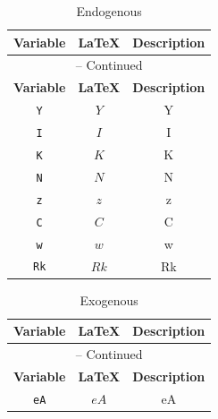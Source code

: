 \begin{center}
\begin{longtable}{ccc}
\caption{Endogenous}\\%
\hline%
\multicolumn{1}{c}{\textbf{Variable}} &
\multicolumn{1}{c}{\textbf{\LaTeX}} &
\multicolumn{1}{c}{\textbf{Description}}\\%
\hline\hline%
\endfirsthead
\multicolumn{3}{c}{{\tablename} \thetable{} -- Continued}\\%
\hline%
\multicolumn{1}{c}{\textbf{Variable}} &
\multicolumn{1}{c}{\textbf{\LaTeX}} &
\multicolumn{1}{c}{\textbf{Description}}\\%
\hline\hline%
\endhead
\texttt{Y} & $Y$ & Y\\
\texttt{I} & $I$ & I\\
\texttt{K} & $K$ & K\\
\texttt{N} & $N$ & N\\
\texttt{z} & $z$ & z\\
\texttt{C} & $C$ & C\\
\texttt{w} & $w$ & w\\
\texttt{Rk} & $Rk$ & Rk\\
\hline%
\end{longtable}
\end{center}
\begin{center}
\begin{longtable}{ccc}
\caption{Exogenous}\\%
\hline%
\multicolumn{1}{c}{\textbf{Variable}} &
\multicolumn{1}{c}{\textbf{\LaTeX}} &
\multicolumn{1}{c}{\textbf{Description}}\\%
\hline\hline%
\endfirsthead
\multicolumn{3}{c}{{\tablename} \thetable{} -- Continued}\\%
\hline%
\multicolumn{1}{c}{\textbf{Variable}} &
\multicolumn{1}{c}{\textbf{\LaTeX}} &
\multicolumn{1}{c}{\textbf{Description}}\\%
\hline\hline%
\endhead
\texttt{eA} & $eA$ & eA\\
\hline%
\end{longtable}
\end{center}
